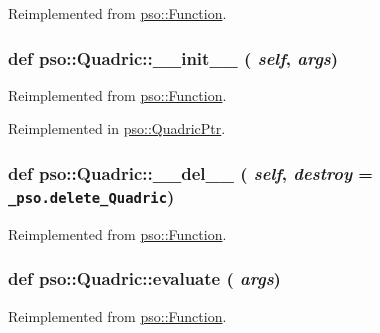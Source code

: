 Reimplemented from \hyperlink{classpso_1_1Function_959f07a6de4f333461fdb0261e6c25ae}{pso::Function}.\hypertarget{classpso_1_1Quadric_fed66f973031f5c183bbdb8ac437315c}{
\subsubsection{\setlength{\rightskip}{0pt plus 5cm}def pso::Quadric::\_\-\_\-init\_\-\_\- ( {\em self}, \/   {\em args})}}
\label{classpso_1_1Quadric_fed66f973031f5c183bbdb8ac437315c}




Reimplemented from \hyperlink{classpso_1_1Function_6874097c6476dc85af64b40e76a807e9}{pso::Function}.

Reimplemented in \hyperlink{classpso_1_1QuadricPtr_206857d4cf8c3ad6fad721d0ef9fc966}{pso::QuadricPtr}.\hypertarget{classpso_1_1Quadric_643ec4862385919c0e08f61f356ea0e6}{
\subsubsection{\setlength{\rightskip}{0pt plus 5cm}def pso::Quadric::\_\-\_\-del\_\-\_\- ( {\em self}, \/   {\em destroy} = {\tt \_\-pso.delete\_\-Quadric})}}
\label{classpso_1_1Quadric_643ec4862385919c0e08f61f356ea0e6}




Reimplemented from \hyperlink{classpso_1_1Function_c80bd40fcf4a956e5732ed099bccc598}{pso::Function}.\hypertarget{classpso_1_1Quadric_bf922b6bbf00b01ca2a449078ecff65a}{
\subsubsection{\setlength{\rightskip}{0pt plus 5cm}def pso::Quadric::evaluate ( {\em args})}}
\label{classpso_1_1Quadric_bf922b6bbf00b01ca2a449078ecff65a}




Reimplemented from \hyperlink{classpso_1_1Function_7c958ea6d942a89ae219b872b4d73541}{pso::Function}.

